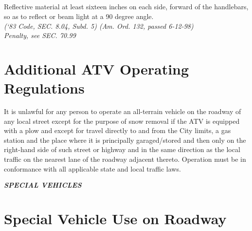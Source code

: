 \subsection{}
Reflective material at least sixteen inches on each side, forward of the handlebars, so as to reflect or beam light at a 90 degree angle.\\
\emph{(‘83 Code, SEC. 8.04, Subd. 5) (Am. Ord. 132, passed 6-12-98)}\\
\emph{Penalty, see SEC. 70.99}

\section{Additional ATV Operating Regulations}
It is unlawful for any person to operate an all-terrain vehicle on the roadway of any local street except for the purpose of snow removal if the ATV is equipped with a plow and except for travel directly to and from the City limits, a gas station and the place where it is principally garaged/stored and then only on the right-hand side of such street or highway and in the same direction as the local traffic on the nearest lane of the roadway adjacent thereto. Operation must be in conformance with all applicable state and local traffic laws.\\

\begin{center}
    \emph{\textbf{\LARGE{SPECIAL VEHICLES}}}
\end{center}

\setcounter{section}{29}
\section{Special Vehicle Use on Roadway}

